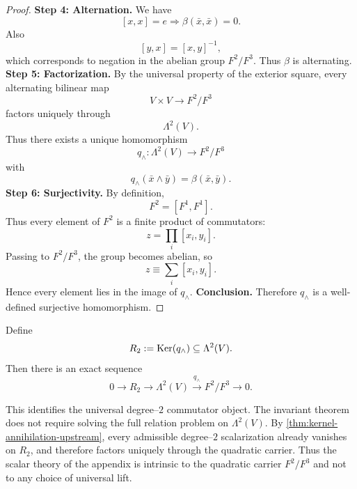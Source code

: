 \begin{proof}
	\noindent
	\textbf{Step 4: Alternation.}
	We have
	\[
		[x,x]=e \Rightarrow \beta(\bar x,\bar x)=0.
	\]
	Also
	\[
		[y,x]=[x,y]^{-1},
	\]
	which corresponds to negation in the abelian group \(F^2/F^3\).
	Thus \(\beta\) is alternating.
	\medskip
	\noindent
	\textbf{Step 5: Factorization.}
	By the universal property of the exterior square,
	every alternating bilinear map
	\[
		V\times V \to F^2/F^3
	\]
	factors uniquely through
	\[
		\Lambda^2(V).
	\]
	Thus there exists a unique homomorphism
	\[
		q_{\wedge}:\Lambda^2(V)\to F^2/F^3
	\]
	with
	\[
		q_{\wedge}(\bar x\wedge \bar y)=\beta(\bar x,\bar y).
	\]
	\medskip
	\noindent
	\textbf{Step 6: Surjectivity.}
	By definition,
	\[
		F^2=[F^1,F^1].
	\]
	Thus every element of \(F^2\) is a finite product of commutators:
	\[
		z=\prod_i [x_i,y_i].
	\]
	Passing to \(F^2/F^3\), the group becomes abelian, so
	\[
		z\equiv \sum_i [x_i,y_i].
	\]
	Hence every element lies in the image of \(q_{\wedge}\).
	\medskip
	\noindent
	\textbf{Conclusion.}
	Therefore \(q_{\wedge}\) is a well-defined surjective homomorphism.
\end{proof}
\begin{definition}
	Define
	\[
		R_2:=\operatorname{Ker}(q_{\wedge})\subseteq \Lambda^2(V).
	\]
	Then there is an exact sequence
	\[
		0\longrightarrow R_2
		\longrightarrow \Lambda^2(V)
		\xrightarrow{q_{\wedge}}
		F^2/F^3
		\longrightarrow 0.
	\]
\end{definition}
\begin{remark}
	This identifies the universal degree--\(2\) commutator object.
	The invariant theorem does not require solving the full relation problem
	on \(\Lambda^2(V)\).
	By \cref{thm:kernel-annihilation-upstream}, every admissible degree--\(2\)
	scalarization already vanishes on \(R_2\), and therefore factors uniquely
	through the quadratic carrier. Thus the scalar theory of the appendix is
	intrinsic to the quadratic carrier \(F^2/F^3\) and not to any choice of universal lift.
\end{remark}
